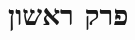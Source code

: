 \documentclass[twosides, 11pt]{book}
\begin{document}
%
\maketitle
\tableofcontents
\newpage
\chapter{פרק ראשון}



\clearpage
\printindex
\end{document}
